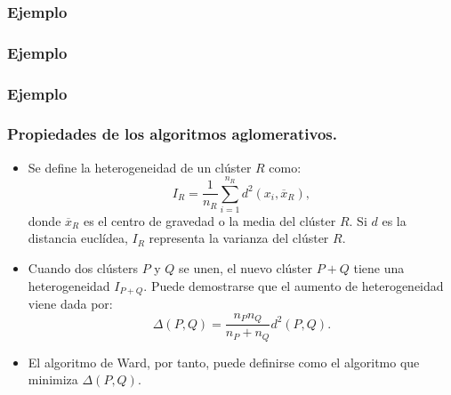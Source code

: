 \begin{frame}
\frametitle{Ejemplo}
\uncover<2->{El dendograma usando el método completo para el ejemplo anterior es:
\vskip 0.05cm
\texttt{[image: DendogramaPuntsComplet.pdf]}}
\end{frame}
\begin{frame}
\frametitle{Ejemplo}
\uncover<2->{El dendograma usando el método promedio para el ejemplo anterior es:
\vskip 0.05cm
\texttt{[image: DendogramaPuntsAverage.pdf]}}
\end{frame}
\begin{frame}
\frametitle{Ejemplo}
\uncover<2->{El dendograma usando el método de Ward para el ejemplo anterior es:
\vskip 0.05cm
\texttt{[image: DendogramaPuntsWard.pdf]}}
\end{frame}
\begin{frame}
\frametitle{Propiedades de los algoritmos aglomerativos.}
\begin{itemize}
\item<2->{Se define la heterogeneidad de un clúster $R$ como:
$$
I_R = \frac{1}{n_R} \sum_{i=1}^{n_R} d^2(x_i,\overline{x}_R),
$$
donde $\overline{x}_R$ es el centro de gravedad o la media del clúster $R$. Si $d$ es la distancia euclídea, $I_R$ representa la varianza del clúster $R$.}
\item<3->{Cuando dos clústers $P$ y $Q$ se unen, el nuevo clúster $P+Q$ tiene una heterogeneidad $I_{P+Q}$. Puede demostrarse que el aumento de heterogeneidad viene dada por:
$$
\Delta (P,Q)= \frac{n_P n_Q}{n_P + n_Q} d^2 (P,Q).
$$}
\item<4->{El algoritmo de Ward, por tanto, puede definirse como el algoritmo que minimiza $\Delta (P,Q)$.}
\end{itemize}
\end{frame}
